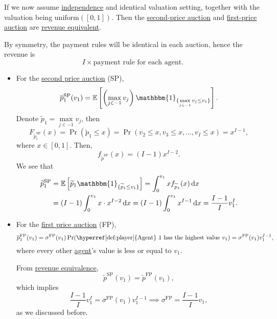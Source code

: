 If we now assume \hyperref[def:independent]{independence} and identical valuation setting, together with the valuation being \(\mathrm{uniform}([0,1])\). Then the \hyperref[eg:second-price-auction]{second-price auction} and \hyperref[eg:first-price-auction]{first-price auction} are \hyperref[rmk:revenue-equivalence]{revenue equivalent}.

By symmetry, the payment rules will be identical in each auction, hence the revenue is
\[
	I\times \text{payment rule for each agent}.
\]

\begin{itemize}
	\item For the \hyperref[eg:second-price-auction]{second price auction} (SP),
	      \[
		      \overline{p}_1^{\mathrm{SP}}(v_1) = \mathbb{E}\left[\left(\max_{j\in -1}v_{j}\right)\mathbbm{1}_{\{ \max\limits_{j\in -1} v_{j}\leq v_1\}}  \right] .
	      \]
	      Denote \(\widetilde{p}_1 = \max\limits_{j\in -1} v_{j}\), then
	      \[
		      F_{\widetilde{p}^{\mathrm{SP}}_i}(x) = \Pr(\widetilde{p}_1\leq x) = \Pr(v_2\leq x, v_3\leq x, \dots , v_I\leq x) = x^{I-1},
	      \]
	      where \(x\in [0, 1]\). Then,
	      \[
		      f_{\widetilde{p}^{\mathrm{SP}}}(x) = (I - 1)x^{I-2}.
	      \]
	      We see that
	      \[
		      \begin{split}
			      \widetilde{p}_1^{\mathrm{SP}} &= \mathbb{E}\left[\widetilde{p}_{1}\mathbbm{1}_{\{ \widetilde{p}_1\leq v_1 \}} \right]
			      =\int_0^{v_1} xf_{\widetilde{p}_1}(x)\,\mathrm{d}x\\
			      &= (I - 1)\int_0^{v_1}x\cdot x^{I-2}\,\mathrm{d}x
			      = (I - 1)\int_0^{v_1}x^{I-1}\,\mathrm{d}x
			      = \frac{I-1}{I}v_1^I.
		      \end{split}
	      \]
	\item For the \hyperref[eg:first-price-auction]{first price auction} (FP),
	      \[
		      \overline{p}_1^{\mathrm{FP}}(v_1)
		      = \sigma^{\mathrm{FP}}(v_1)\Pr(\text{\hyperref[def:player]{Agent} 1 has the highest value \(v_1\)})
		      = \sigma^{\mathrm{FP}}(v_1)v_1^{I-1},
	      \]
	      where every other \hyperref[def:player]{agent}'s value is less or equal to \(v_1\).

	      From \hyperref[rmk:revenue-equivalence]{revenue equivalence},
	      \[
		      \widetilde{p}^{\mathrm{SP}}(v_1) = \widetilde{p}^{\mathrm{FP}}(v_1),
	      \]
	      which implies
	      \[
		      \frac{I-1}{I}v_{1}^I = \sigma^{\mathrm{FP}}(v_1)v_1^{I-1} \implies \sigma^{\mathrm{FP}} = \frac{I-1}{I}v_1,
	      \]
	      as we discussed before.
\end{itemize}

